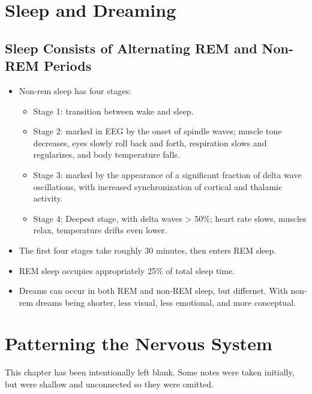 \documentclass[12pt,a4paper]{article}
\begin{document}
\clearpage
\section{Sleep and Dreaming}
\subsection{Sleep Consists of Alternating REM and Non-REM Periods}
\begin{itemize}
    \item Non-rem sleep has four stages:
        \begin{itemize}
            \item Stage 1: transition between wake and sleep.
            \item Stage 2: marked in EEG by the onset of spindle waves; muscle tone decreases, eyes slowly roll back and forth, respiration slows and regularizes, and body temperature falls.
            \item Stage 3: marked by the appearance of a significant fraction of delta wave oscillations, with increased synchronization of cortical and thalamic activity.
            \item Stage 4: Deepest stage, with delta waves > 50\%; heart rate slows, muscles relax, temperature drifts even lower.
        \end{itemize}
    \item The first four stages take roughly 30 minutes, then enters REM sleep.
    \item REM sleep occupies appropriately 25\% of total sleep time.
    \item Dreams can occur in both REM and non-REM sleep, but differnet. With non-rem dreams being shorter, less visual, less emotional, and more conceptual.
\end{itemize}

\clearpage
{}

\clearpage
\section{Patterning the Nervous System}
    This chapter has been intentionally left blank. Some notes were taken initially, but were shallow and unconnected so they were omitted.
\end{document}
